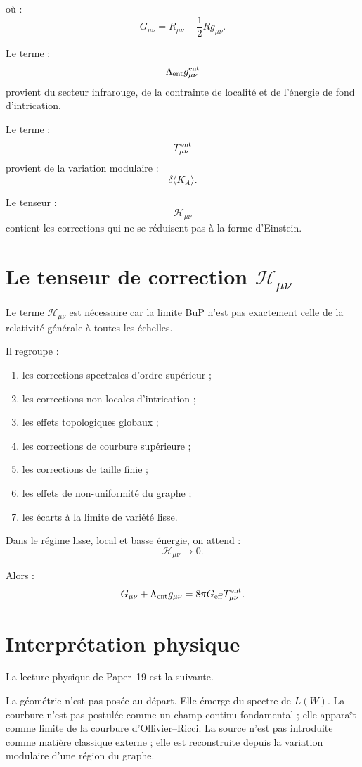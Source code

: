 \documentclass[11pt,a4paper]{article}
\begin{document}
où :
\[
G_{\mu\nu}
=
R_{\mu\nu}
-
\frac{1}{2}Rg_{\mu\nu}.
\]

Le terme :
\[
\Lambda_{\rm ent}g_{\mu\nu}^{\rm ent}
\]
provient du secteur infrarouge, de la contrainte de localité et de l'énergie
de fond d'intrication.

Le terme :
\[
T_{\mu\nu}^{\rm ent}
\]
provient de la variation modulaire :
\[
\delta\langle K_A\rangle.
\]

Le tenseur :
\[
\mathcal{H}_{\mu\nu}
\]
contient les corrections qui ne se réduisent pas à la forme d'Einstein.

\section{Le tenseur de correction \(\mathcal{H}_{\mu\nu}\)}

Le terme \(\mathcal{H}_{\mu\nu}\) est nécessaire car la limite BuP n'est pas
exactement celle de la relativité générale à toutes les échelles.

Il regroupe :

\begin{enumerate}
    \item les corrections spectrales d'ordre supérieur ;
    \item les corrections non locales d'intrication ;
    \item les effets topologiques globaux ;
    \item les corrections de courbure supérieure ;
    \item les corrections de taille finie ;
    \item les effets de non-uniformité du graphe ;
    \item les écarts à la limite de variété lisse.
\end{enumerate}

Dans le régime lisse, local et basse énergie, on attend :
\[
\mathcal{H}_{\mu\nu}\to0.
\]

Alors :
\[
G_{\mu\nu}
+
\Lambda_{\rm ent}g_{\mu\nu}
=
8\pi G_{\rm eff}T_{\mu\nu}^{\rm ent}.
\]

\section{Interprétation physique}

La lecture physique de Paper~19 est la suivante.

La géométrie n'est pas posée au départ. Elle émerge du spectre de
\(L(W)\). La courbure n'est pas postulée comme un champ continu fondamental ;
elle apparaît comme limite de la courbure d'Ollivier--Ricci. La source n'est
pas introduite comme matière classique externe ; elle est reconstruite depuis
la variation modulaire d'une région du graphe.
\end{document}
